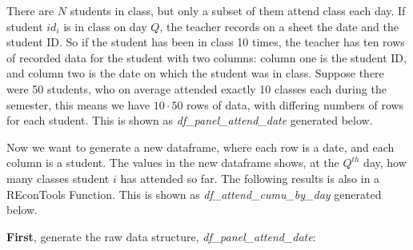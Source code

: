\documentclass[
]{book}
\begin{document}
There are \(N\) students in class, but only a subset of them attend class each day. If student \(id_i\) is in class on day \(Q\), the teacher records on a sheet the date and the student ID. So if the student has been in class 10 times, the teacher has ten rows of recorded data for the student with two columns: column one is the student ID, and column two is the date on which the student was in class. Suppose there were 50 students, who on average attended exactly 10 classes each during the semester, this means we have \(10 \cdot 50\) rows of data, with differing numbers of rows for each student. This is shown as \emph{df\_panel\_attend\_date} generated below.

Now we want to generate a new dataframe, where each row is a date, and each column is a student. The values in the new dataframe shows, at the \(Q^{th}\) day, how many classes student \(i\) has attended so far. The following results is also in a REconTools Function. This is shown as \emph{df\_attend\_cumu\_by\_day} generated below.

\textbf{First}, generate the raw data structure, \emph{df\_panel\_attend\_date}:
\end{document}
